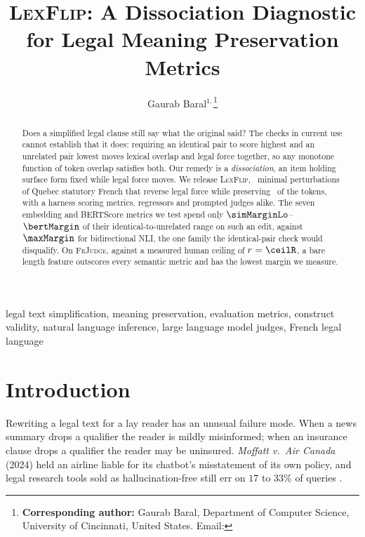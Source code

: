 \documentclass{BVP_JCLLT}
\begin{document}

\title{\textsc{LexFlip}: A Dissociation Diagnostic for Legal Meaning Preservation Metrics}

\author{Gaurab Baral$^{1,}$\thanks{\textbf{Corresponding author:} Gaurab Baral, Department of Computer Science, University of Cincinnati, United States. Email: }}


\begin{abstract}
Does a simplified legal clause still say what the original said? The checks in
current use cannot establish that it does: requiring an identical pair to score
highest and an unrelated pair lowest moves lexical overlap and legal force
together, so any monotone function of token overlap satisfies both. Our remedy
is a \emph{dissociation}, an item holding surface form fixed while legal force
moves. We release \textsc{LexFlip}, \numedits\ minimal perturbations of Quebec
statutory French that reverse legal force while preserving \meanjaccard\ of the
tokens, with a harness scoring metrics, regressors and prompted judges alike.
The seven embedding and BERTScore metrics we test spend only
$\simMarginLo$--$\bertMargin$ of their identical-to-unrelated range on such an
edit, against $\maxMargin$ for bidirectional NLI, the one family the
identical-pair check would disqualify. On \textsc{FrJudge}, against a measured
human ceiling of $r=\ceilR$, a bare length feature outscores every semantic
metric and has the lowest margin we measure.
\end{abstract}

\begin{keywords}
legal text simplification, meaning preservation, evaluation metrics, construct
validity, natural language inference, large language model judges, French legal
language
\end{keywords}

\maketitle

\section{Introduction}\label{sec:intro}

Rewriting a legal text for a lay reader has an unusual failure mode. When a news
summary drops a qualifier the reader is mildly misinformed; when an insurance
clause drops a qualifier the reader may be uninsured. \emph{Moffatt v.\ Air
Canada} (2024) held an airline liable for its chatbot's misstatement of its own
policy, and legal research tools sold as hallucination-free still err on $17$ to
$33\%$ of queries \cite{magesh2025hallucinationfree}.
\end{document}
